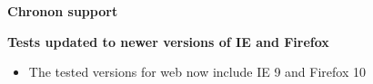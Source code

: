 \textbf{Chronon support}


\textbf{Tests updated to newer versions of IE and Firefox}
\begin{itemize}
\item The tested versions for web \gdauts{} now include IE 9 and Firefox 10
\end{itemize}
